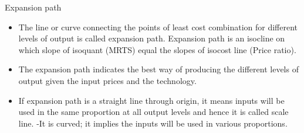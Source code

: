 \documentclass[12pt,ignorenonframetext,aspectratio=169]{beamer}
\providecommand{\tightlist}{%
  \setlength{\itemsep}{0pt}\setlength{\parskip}{0pt}}
\begin{document}
\begin{frame}{Expansion path}
\protect\hypertarget{expansion-path}{}
\begin{itemize}
\tightlist
\item
  The line or curve connecting the points of least cost combination for
  different levels of output is called expansion path. Expansion path is
  an isocline on which slope of isoquant (MRTS) equal the slopes of
  isocost line (Price ratio).
\item
  The expansion path indicates the best way of producing the different
  levels of output given the input prices and the technology.
\item
  If expansion path is a straight line through origin, it means inputs
  will be used in the same proportion at all output levels and hence it
  is called scale line. -It is curved; it implies the inputs will be
  used in various proportions.
\end{itemize}
\end{frame}
\end{document}
